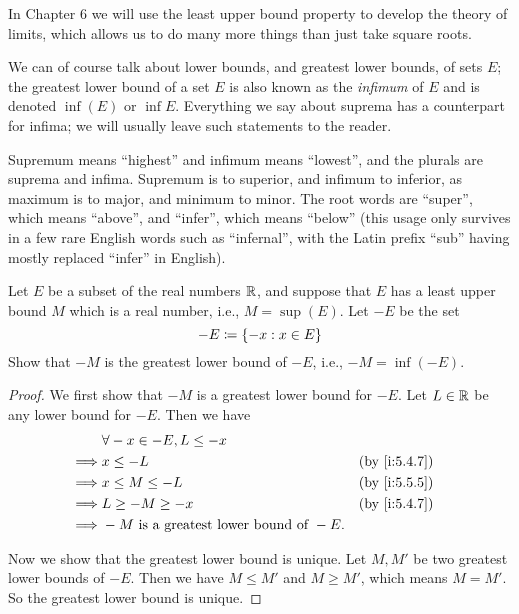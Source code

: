 \begin{rmk}\label{i:5.5.14}
  In Chapter 6 we will use the least upper bound property to develop the theory of limits, which allows us to do many more things than just take square roots.
\end{rmk}

\begin{rmk}\label{i:5.5.15}
  We can of course talk about lower bounds, and greatest lower bounds, of sets \(E\);
  the greatest lower bound of a set \(E\) is also known as the \emph{infimum} of \(E\) and is denoted \(\inf(E)\) or \(\inf E\).
  Everything we say about suprema has a counterpart for infima;
  we will usually leave such statements to the reader.
\end{rmk}

\begin{note}
  Supremum means ``highest'' and infimum means ``lowest'', and the plurals are suprema and infima.
  Supremum is to superior, and infimum to inferior, as maximum is to major, and minimum to minor.
  The root words are ``super'', which means ``above'', and ``infer'', which means ``below''
  (this usage only survives in a few rare English words such as ``infernal'', with the Latin prefix ``sub'' having mostly replaced ``infer'' in English).
\end{note}

\exercisesection

\begin{ex}\label{i:ex:5.5.1}
  Let \(E\) be a subset of the real numbers \(\mathbb{R}\), and suppose that \(E\) has a least upper bound \(M\) which is a real number, i.e., \(M = \sup(E)\).
  Let \(-E\) be the set
  \[
    -E \coloneqq \left\lbrace-x : x \in E\right\rbrace
  \]
  Show that \(-M\) is the greatest lower bound of \(-E\), i.e., \(-M = \inf(-E)\).
\end{ex}

\begin{proof}
  We first show that \(-M\) is a greatest lower bound for \(-E\).
  Let \(L \in \mathbb{R}\) be any lower bound for \(-E\).
  Then we have
  \begin{align*}
             & \forall -x \in -E, L \leq -x                                   \\
    \implies & x \leq -L                                    &  & \by{i:5.4.7} \\
    \implies & x \leq M \leq -L                             &  & \by{i:5.5.5} \\
    \implies & L \geq -M \geq -x                            &  & \by{i:5.4.7} \\
    \implies & -M \text{ is a greatest lower bound of } -E.
  \end{align*}

  Now we show that the greatest lower bound is unique.
  Let \(M, M'\) be two greatest lower bounds of \(-E\).
  Then we have \(M \leq M'\) and \(M \geq M'\), which means \(M = M'\).
  So the greatest lower bound is unique.
\end{proof}

